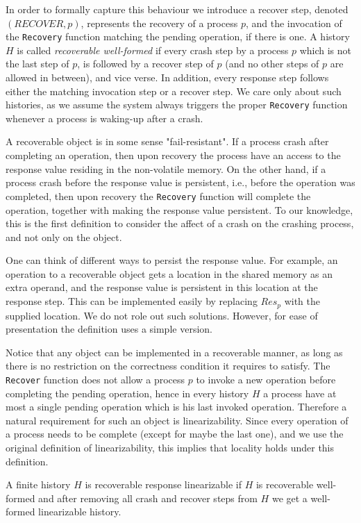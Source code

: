 In order to formally capture this behaviour we introduce a recover step, denoted $(RECOVER,p)$, represents the recovery of a process $p$, and the invocation of the \texttt{Recovery} function matching the pending operation, if there is one.
A history $H$ is called \textit{recoverable well-formed} if every crash step by a process $p$ which is not the last step of $p$, is followed by a recover step of $p$ (and no other steps of $p$ are allowed in between), and vice verse. In addition, every response step follows either the matching invocation step or a recover step. We care only about such histories, as we assume the system always triggers the proper \texttt{Recovery} function whenever a process is waking-up after a crash.


A recoverable object is in some sense "fail-resistant". If a process crash after completing an operation, then upon recovery the process have an access to the response value residing in the non-volatile memory. On the other hand, if a process crash before the response value is persistent, i.e., before the operation was completed, then upon recovery the \texttt{Recovery} function will complete the operation, together with making the response value persistent. To our knowledge, this is the first definition to consider the affect of a crash on the crashing process, and not only on the object.

One can think of different ways to persist the response value. For example, an operation to a recoverable object gets a location in the shared memory as an extra operand, and the response value is persistent in this location at the response step. This can be implemented easily by replacing $Res_p$ with the supplied location. We do not role out such solutions. However, for ease of presentation the definition uses a simple version.

Notice that any object can be implemented in a recoverable manner, as long as there is no restriction on the correctness condition it requires to satisfy. The \texttt{Recover} function does not allow a process $p$ to invoke a new operation before completing the pending operation, hence in every history $H$ a process have at most a single pending operation which is his last invoked operation. Therefore a natural requirement for such an object is linearizability. Since every operation of a process needs to be complete (except for maybe the last one), and we use the original definition of linearizability, this implies that locality holds under this definition.

\begin{definition} 
	\label{Definition: RR-linearizability}
	A finite history $H$ is recoverable response linearizable if $H$ is recoverable well-formed and after removing all crash and recover steps from $H$ we get a well-formed linearizable history.
\end{definition}

